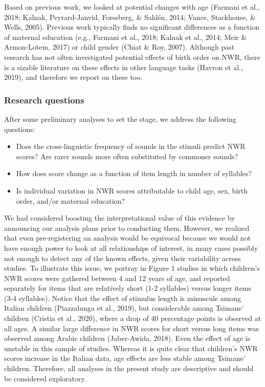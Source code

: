 \documentclass[english,,man,floatsintext]{apa6}
\providecommand{\tightlist}{%
  \setlength{\itemsep}{0pt}\setlength{\parskip}{0pt}}
\begin{document}
Based on previous work, we looked at potential changes with age (Farmani et al., 2018; Kalnak, Peyrard-Janvid, Forssberg, \& Sahlén, 2014; Vance, Stackhouse, \& Wells, 2005). Previous work typically finds no significant differences as a function of maternal education (e.g., Farmani et al., 2018; Kalnak et al., 2014; Meir \& Armon-Lotem, 2017) or child gender (Chiat \& Roy, 2007). Although past research has not often investigated potential effects of birth order on NWR, there is a sizable literature on these effects in other language tasks (Havron et al., 2019), and therefore we report on these too.

\hypertarget{research-questions}{%
\subsubsection{Research questions}\label{research-questions}}

After some preliminary analyses to set the stage, we address the following questions:

\begin{itemize}
\tightlist
\item
  Does the cross-linguistic frequency of sounds in the stimuli predict NWR scores? Are rarer sounds more often substituted by commoner sounds?
\item
  How does score change as a function of item length in number of syllables?
\item
  Is individual variation in NWR scores attributable to child age, sex, birth order, and/or maternal education?
\end{itemize}

We had considered boosting the interpretational value of this evidence by announcing our analysis plans prior to conducting them. However, we realized that even pre-registering an analysis would be equivocal because we would not have enough power to look at all relationships of interest, in many cases possibly not enough to detect any of the known effects, given their variability across studies. To illustrate this issue, we portray in Figure 1 studies in which children's NWR scores were gathered between 4 and 12 years of age, and reported separately for items that are relatively short (1-2 syllables) versus longer items (3-4 syllables). Notice that the effect of stimulus length is minuscule among Italian children (Piazzalunga et al., 2019), but considerable among Tsimane' children (Cristia et al., 2020), where a drop of 40 percentage points is observed at all ages. A similar large difference in NWR scores for short versus long items was observed among Arabic children (Jaber-Awida, 2018). Even the effect of age is unstable in this sample of studies. Whereas it is quite clear that children's NWR scores increase in the Italian data, age effects are less stable among Tsimane' children. Therefore, all analyses in the present study are descriptive and should be considered exploratory.
\end{document}
